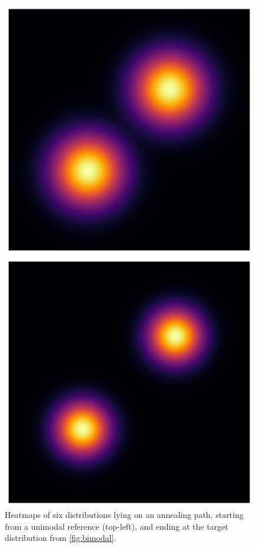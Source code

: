 \begin{figure}[t]
\begin{minipage}{0.333\linewidth}
    \end{minipage}%
    \begin{minipage}{0.333\linewidth}
      \centering
      \includegraphics[width=\linewidth]{../img/heatmap_path_5.pdf}
    \end{minipage}%
    \begin{minipage}{0.333\linewidth}
      \centering
      \includegraphics[width=\linewidth]{../img/heatmap_path_6.pdf}
    \end{minipage}
    \caption{Heatmaps of six distributions lying on an annealing path, 
    starting from a unimodal reference (top-left), and ending at the target
    distribution from \cref{fig:bimodal}.}
    \label{fig:path}
\end{figure}

